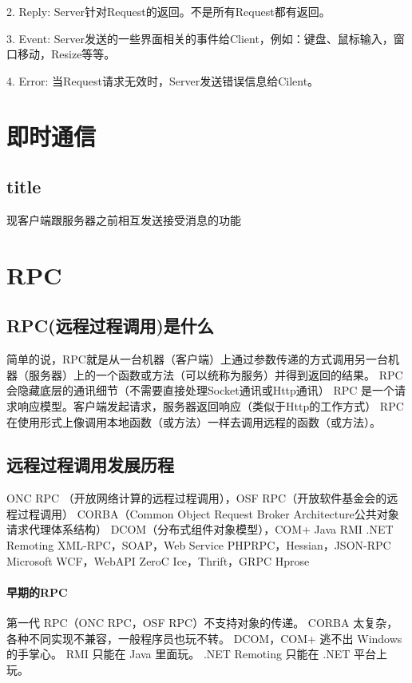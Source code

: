 \documentclass{book}
\begin{document}
2. Reply: Server针对Request的返回。不是所有Request都有返回。

3. Event: Server发送的一些界面相关的事件给Client，例如：键盘、鼠标输入，窗口移动，Resize等等。

4. Error: 当Request请求无效时，Server发送错误信息给Cilent。

\section{即时通信}

\subsection{title}

现客户端跟服务器之前相互发送接受消息的功能

\section{RPC}

\subsection{RPC(远程过程调用)是什么}

简单的说，RPC就是从一台机器（客户端）上通过参数传递的方式调用另一台机器（服务器）上的一个函数或方法（可以统称为服务）并得到返回的结果。
RPC 会隐藏底层的通讯细节（不需要直接处理Socket通讯或Http通讯）
RPC 是一个请求响应模型。客户端发起请求，服务器返回响应（类似于Http的工作方式）
RPC 在使用形式上像调用本地函数（或方法）一样去调用远程的函数（或方法）。

\subsection{远程过程调用发展历程}

ONC RPC （开放网络计算的远程过程调用），OSF RPC（开放软件基金会的远程过程调用）
CORBA（Common Object Request Broker Architecture公共对象请求代理体系结构）
DCOM（分布式组件对象模型），COM+
Java RMI
.NET Remoting
XML-RPC，SOAP，Web Service
PHPRPC，Hessian，JSON-RPC
Microsoft WCF，WebAPI
ZeroC Ice，Thrift，GRPC
Hprose

\paragraph{早期的RPC}

第一代 RPC（ONC RPC，OSF RPC）不支持对象的传递。
CORBA 太复杂，各种不同实现不兼容，一般程序员也玩不转。
DCOM，COM+ 逃不出 Windows 的手掌心。
RMI 只能在 Java 里面玩。
.NET Remoting 只能在 .NET 平台上玩。
\end{document}
